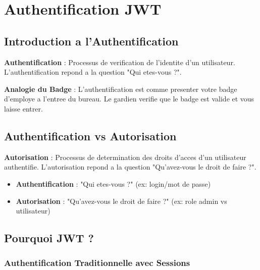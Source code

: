 \documentclass[a4paper,12pt]{book}
\begin{document}
\chapter{Authentification JWT}

\section{Introduction a l'Authentification}

\begin{definitionbox}
    \textbf{Authentification} : Processus de verification de l'identite d'un utilisateur. L'authentification repond a la question "Qui etes-vous ?".
\end{definitionbox}

\begin{analogybox}
    \textbf{Analogie du Badge} : L'authentification est comme presenter votre badge d'employe a l'entree du bureau. Le gardien verifie que le badge est valide et vous laisse entrer.
\end{analogybox}

\section{Authentification vs Autorisation}

\begin{definitionbox}
    \textbf{Autorisation} : Processus de determination des droits d'acces d'un utilisateur authentifie. L'autorisation repond a la question "Qu'avez-vous le droit de faire ?".
\end{definitionbox}

\begin{itemize}
    \item \textbf{Authentification} : "Qui etes-vous ?" (ex: login/mot de passe)
    \item \textbf{Autorisation} : "Qu'avez-vous le droit de faire ?" (ex: role admin vs utilisateur)
\end{itemize}

\section{Pourquoi JWT ?}

\subsection{Authentification Traditionnelle avec Sessions}
\end{document}
